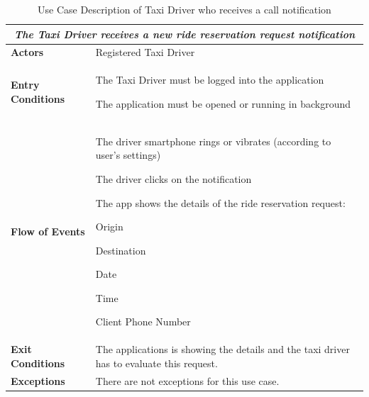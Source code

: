 \documentclass[a4paper]{article}
\begin{document}
\begin{table} [H]
\begin{center}
\begin{tabular}{ |m{}|m{}|  }
\hline
    \multicolumn{2}{|c|}{\textbf{\textit{The Taxi Driver receives a new ride reservation request notification}}} \\
\hline \hline
    \textbf{Actors}
&   Registered Taxi Driver
\\ \hline
    \textbf{Entry Conditions}
&   
    \begin{itemize*}
    \item The Taxi Driver must be logged into the application
    \item The application must be opened or running in background
    \end{itemize*}
\\ \hline
    \textbf{Flow of Events}
& 
    \begin{enumerate*}
    \item The driver smartphone rings or vibrates (according to user's settings)
    \item The driver clicks on the notification
    \item The app shows the details of the ride reservation request:
        \begin{itemize*}
        \item Origin
        \item Destination
        \item Date
        \item Time
        \item Client Phone Number
        \end{itemize*}
    \end{enumerate*}
\\ \hline
    \textbf{Exit Conditions}
&  The applications is showing the details and the taxi driver has to evaluate this request.
\\ \hline
    \textbf{Exceptions}
&   There are not exceptions for this use case.
\\ \hline
\end{tabular}
\end{center}
\caption{Use Case Description of Taxi Driver who receives a call notification}
\label{table:taxireceiveridereservationnotification}
\end{table}
\end{document}
